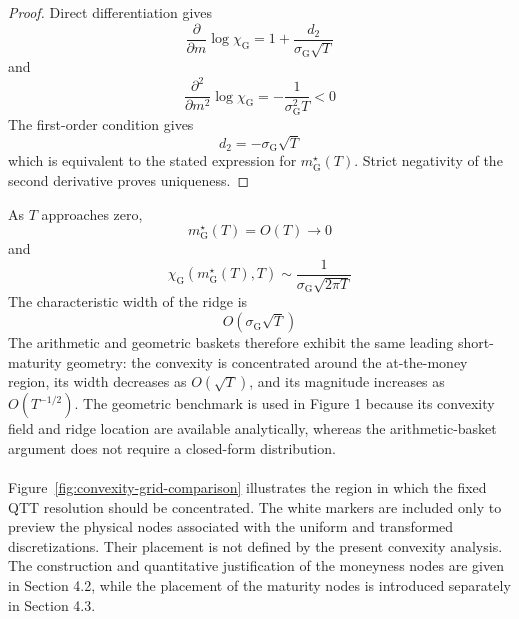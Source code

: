 \documentclass{article}
\numberwithin{equation}{subsection}
\theoremstyle{definition}
\theoremstyle{remark}
\begin{document}
\begin{proof}
Direct differentiation gives
\begin{equation}
\frac{\partial}{\partial m}
\log\chi_{\mathrm{G}}
=
1+
\frac{d_2}{
\sigma_{\mathrm{G}}\sqrt{T}
}
\end{equation}
and
\begin{equation}
\frac{\partial^2}{\partial m^2}
\log\chi_{\mathrm{G}}
=
-
\frac{1}{
\sigma_{\mathrm{G}}^2T
}
<0
\end{equation}
The first-order condition gives
\begin{equation}
d_2
=
-\sigma_{\mathrm{G}}\sqrt{T}
\end{equation}
which is equivalent to the stated expression for \(m_{\mathrm{G}}^\star(T)\). Strict negativity of the second derivative proves uniqueness.
\end{proof}
As \(T\) approaches zero,
\begin{equation}
m_{\mathrm{G}}^\star(T)
=
O(T)
\longrightarrow 0
\end{equation}
and
\begin{equation}
\chi_{\mathrm{G}}
\left(
m_{\mathrm{G}}^\star(T),T
\right)
\sim
\frac{1}{
\sigma_{\mathrm{G}}\sqrt{2\pi T}
}
\end{equation}
The characteristic width of the ridge is
\begin{equation}
O
\left(
\sigma_{\mathrm{G}}\sqrt{T}
\right)
\end{equation}
The arithmetic and geometric baskets therefore exhibit the same leading short-maturity geometry: the convexity is concentrated around the at-the-money region, its width decreases as \(O(\sqrt{T})\), and its magnitude increases as \(O(T^{-1/2})\). The geometric benchmark is used in Figure 1 because its convexity field and ridge location are available analytically, whereas the arithmetic-basket argument does not require a closed-form distribution.\\
\\
Figure~\ref{fig:convexity-grid-comparison} illustrates the region in which the fixed QTT resolution should be concentrated. The white markers are included only to preview the physical nodes associated with the uniform and transformed discretizations. Their placement is not defined by the present convexity analysis. The construction and quantitative justification of the moneyness nodes are given in Section 4.2, while the placement of the maturity nodes is introduced separately in Section 4.3.\\
\\
\end{document}
